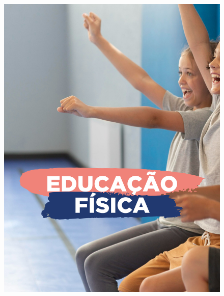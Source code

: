 \begin{figure}[htpb]
\vspace*{-2.5cm}
\hspace*{-2.5cm}\includegraphics[height=\paperheight]{../separadores/separadorEF5A.png}
\end{figure}
\pagebreak
